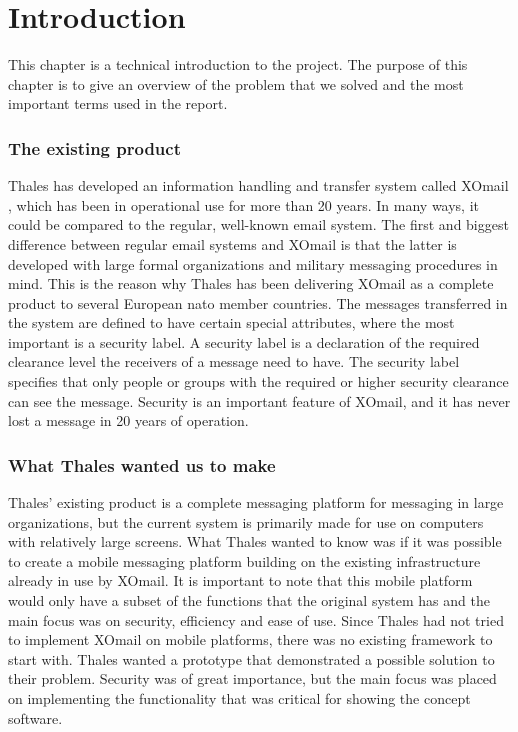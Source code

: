 \chapter{Introduction}

This chapter is a technical introduction to the project. The purpose of this chapter is to give an overview of the problem that we solved and the most important terms used in the report.

\subsection*{The existing product}
Thales has developed an information handling and transfer system called XOmail \cite{bib:xomail}, which has been in operational use for more than 20 years. In many ways, it could be compared to the regular, well-known email system. The first and biggest difference between regular email systems and XOmail is that the latter is developed with large formal organizations and military messaging procedures in mind. This is the reason why Thales has been delivering XOmail as a complete product to several European \gls{nato} member countries.  
\newline
\newline
The messages transferred in the system are defined to have certain special attributes, where the most important is a security label. A security label is a declaration of the required clearance level the receivers of a message need to have. The security label specifies that only people or groups with the required or higher security clearance can see the message. Security is an important feature of XOmail, and it has never lost a message in 20 years of operation.

\subsection*{What Thales wanted us to make}
Thales’ existing product is a complete messaging platform for messaging in large organizations, but the current system is primarily made for use on computers with relatively large screens. What Thales wanted to know was if it was possible to create a mobile messaging platform building on the existing infrastructure already in use by XOmail. It is important to note that this mobile platform would  only have a subset of the functions that the original system has and the main focus was on security, efficiency and ease of use.
\newline
\newline
Since Thales had not tried to implement XOmail on mobile platforms, there was no existing framework to start with. Thales wanted a prototype that demonstrated a possible solution to their problem. Security was of great importance, but the main focus was placed on implementing the functionality that was critical for showing the concept software.  

